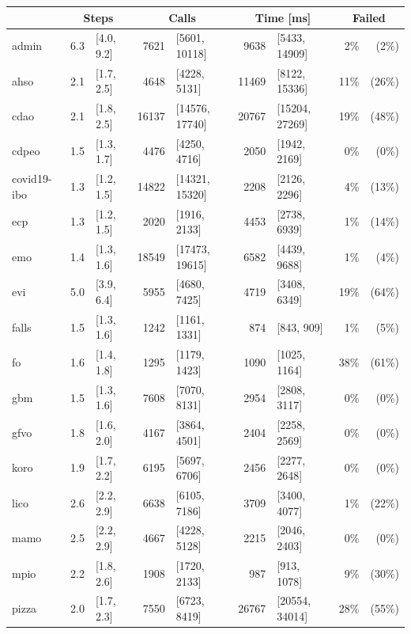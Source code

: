 \begin{table}[ht]
  \scriptsize
  \centering
  \begin{tabular}{|l|r@{ }lr@{ }lr@{ }lr@{ }r|}
    \cline{2-9}
    \multicolumn{1}{l|}{} & \multicolumn{2}{c}{Steps} & \multicolumn{2}{c}{Calls} & \multicolumn{2}{c}{Time [ms]} & \multicolumn{2}{c|}{Failed} \\
    \hline
    admin & 6.3 & [4.0, 9.2] & 7621 & [5601, 10118] & 9638 & [5433, 14909] & 2\% & (2\%) \\
    ahso & 2.1 & [1.7, 2.5] & 4648 & [4228, 5131] & 11469 & [8122, 15336] & 11\% & (26\%) \\
    cdao & 2.1 & [1.8, 2.5] & 16137 & [14576, 17740] & 20767 & [15204, 27269] & 19\% & (48\%) \\
    cdpeo & 1.5 & [1.3, 1.7] & 4476 & [4250, 4716] & 2050 & [1942, 2169] & 0\% & (0\%) \\
    covid19-ibo & 1.3 & [1.2, 1.5] & 14822 & [14321, 15320] & 2208 & [2126, 2296] & 4\% & (13\%) \\
    ecp & 1.3 & [1.2, 1.5] & 2020 & [1916, 2133] & 4453 & [2738, 6939] & 1\% & (14\%) \\
    emo & 1.4 & [1.3, 1.6] & 18549 & [17473, 19615] & 6582 & [4439, 9688] & 1\% & (4\%) \\
    evi & 5.0 & [3.9, 6.4] & 5955 & [4680, 7425] & 4719 & [3408, 6349] & 19\% & (64\%) \\
    falls & 1.5 & [1.3, 1.6] & 1242 & [1161, 1331] & 874 & [843, 909] & 1\% & (5\%) \\
    fo & 1.6 & [1.4, 1.8] & 1295 & [1179, 1423] & 1090 & [1025, 1164] & 38\% & (61\%) \\
    gbm & 1.5 & [1.3, 1.6] & 7608 & [7070, 8131] & 2954 & [2808, 3117] & 0\% & (0\%) \\
    gfvo & 1.8 & [1.6, 2.0] & 4167 & [3864, 4501] & 2404 & [2258, 2569] & 0\% & (0\%) \\
    koro & 1.9 & [1.7, 2.2] & 6195 & [5697, 6706] & 2456 & [2277, 2648] & 0\% & (0\%) \\
    lico & 2.6 & [2.2, 2.9] & 6638 & [6105, 7186] & 3709 & [3400, 4077] & 1\% & (22\%) \\
    mamo & 2.5 & [2.2, 2.9] & 4667 & [4228, 5128] & 2215 & [2046, 2403] & 0\% & (0\%) \\
    mpio & 2.2 & [1.8, 2.6] & 1908 & [1720, 2133] & 987 & [913, 1078] & 9\% & (30\%) \\
    pizza & 2.0 & [1.7, 2.3] & 7550 & [6723, 8419] & 26767 & [20554, 34014] & 28\% & (55\%) \\

\end{tabular}
\end{table}
